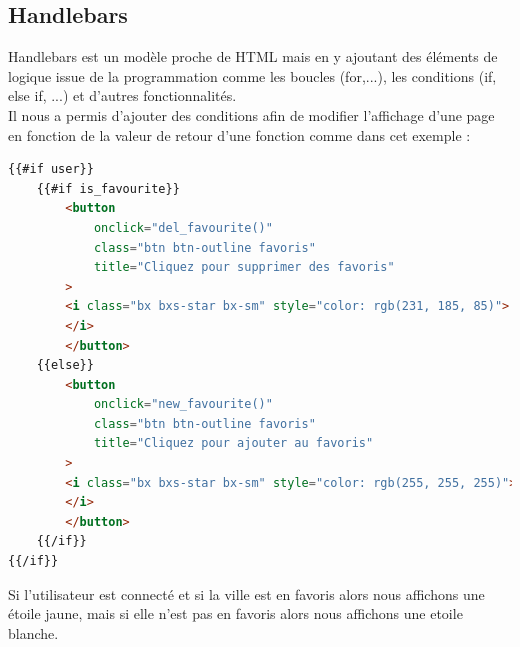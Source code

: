 \documentclass[12pt, french]{article}
\begin{document}
		\subsection{Handlebars}
		Handlebars\cite{Handlebars} est un modèle proche de HTML mais en y ajoutant des éléments de logique issue de la programmation comme les boucles (for,...), les conditions (if, else if, ...) et d'autres fonctionnalités. \\
		Il nous a permis d'ajouter des conditions afin de modifier l'affichage d'une page en fonction de la valeur de retour d'une fonction comme dans cet exemple :\newpage
		\begin{lstlisting}[language=html]
{{#if user}}
	{{#if is_favourite}}
		<button
			onclick="del_favourite()"
			class="btn btn-outline favoris"
			title="Cliquez pour supprimer des favoris"
		>
		<i class="bx bxs-star bx-sm" style="color: rgb(231, 185, 85)">
		</i>
		</button>
	{{else}}
		<button
			onclick="new_favourite()"
			class="btn btn-outline favoris"
			title="Cliquez pour ajouter au favoris"
		>
		<i class="bx bxs-star bx-sm" style="color: rgb(255, 255, 255)">
		</i>
		</button>
	{{/if}}
{{/if}}\end{lstlisting}
		
		Si l'utilisateur est connecté et si la ville est en favoris alors nous affichons une étoile jaune, mais si elle n'est pas en favoris alors nous affichons une etoile blanche.
		
\end{document}
